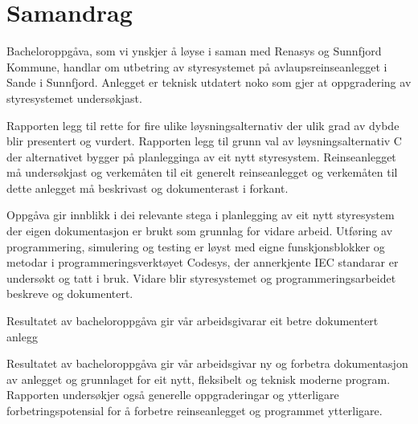 \chapter{Samandrag}
\thispagestyle{romanpages}

Bacheloroppgåva, som vi ynskjer å løyse i saman med \gls{Renasys} og \gls{Sunnfjord Kommune}, handlar om utbetring av styresystemet på 
avlaupsreinseanlegget i Sande i Sunnfjord. 
Anlegget er teknisk utdatert noko som gjer at oppgradering av styresystemet undersøkjast.

Rapporten legg til rette for fire ulike løysningsalternativ
der ulik grad av dybde blir presentert og vurdert. \newline
Rapporten legg til grunn val av løysningsalternativ C der alternativet bygger på planlegginga av eit nytt styresystem. 
Reinseanlegget må undersøkjast og 
verkemåten til eit generelt reinseanlegget og verkemåten til dette anlegget må beskrivast og dokumenterast i forkant.

Oppgåva gir innblikk i dei relevante stega i planlegging av eit nytt styresystem der eigen dokumentasjon er brukt som grunnlag for vidare arbeid. 
Utføring av programmering, simulering og testing er løyst med eigne funskjonsblokker og metodar i programmeringsverktøyet \gls{Codesys},
der annerkjente \gls{IEC} standarar er undersøkt og tatt i bruk.
Vidare blir styresystemet og programmeringsarbeidet beskreve og dokumentert.

Resultatet av bacheloroppgåva gir vår arbeidsgivarar eit betre dokumentert anlegg

Resultatet av bacheloroppgåva gir vår arbeidsgivar ny og forbetra dokumentasjon av anlegget 
og grunnlaget for eit nytt, fleksibelt og teknisk moderne program. 
Rapporten undersøkjer også generelle oppgraderingar og ytterligare forbetringspotensial 
for å forbetre reinseanlegget og programmet ytterligare.